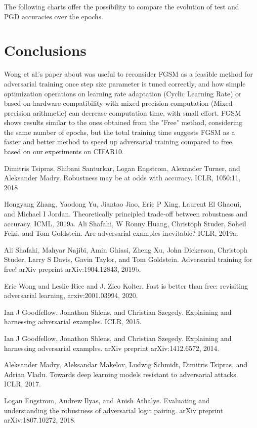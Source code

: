 \documentclass{article}
\begin{document}
The following charts offer the possibility to compare the evolution of test and PGD accuracies over the epochs.

\section{Conclusions}
Wong et al.'s paper about was useful to reconsider FGSM as a feasible method for adversarial training once step size parameter is tuned correctly, and how simple optimization operations on learning rate adaptation (Cyclic Learning Rate) or based on hardware compatibility with mixed precision computation (Mixed-precision arithmetic) can decrease computation time, with small effort.
FGSM shows results similar to the ones obtained from the "Free" method, considering the same number of epochs, but the total training time suggests FGSM as a faster and better method to speed up adversarial training compared to free, based on our experiments on CIFAR10.   



\begin{thebibliography}{100} 
	 {Dimitris Tsipras, Shibani Santurkar, Logan Engstrom, Alexander Turner, and Aleksander Madry. Robustness may be at odds with accuracy. ICLR, 1050:11, 2018}

	 {Hongyang Zhang, Yaodong Yu, Jiantao Jiao, Eric P Xing, Laurent El Ghaoui, and Michael I Jordan. Theoretically principled trade-off between robustness and accuracy. ICML, 2019a.}
	 {Ali Shafahi, W Ronny Huang, Christoph Studer, Soheil Feizi, and Tom Goldstein. Are adversarial examples inevitable? ICLR, 2019a.}
	
	 {Ali Shafahi, Mahyar Najibi, Amin Ghiasi, Zheng Xu, John Dickerson, Christoph Studer, Larry S
		Davis, Gavin Taylor, and Tom Goldstein. Adversarial training for free!
		arXiv preprint
		arXiv:1904.12843, 2019b.}
	
	 {Eric Wong and Leslie Rice and J. Zico Kolter. Fast is better than free: revisiting adversarial learning, arxiv:2001.03994, 2020.}
	
	 {Ian J Goodfellow, Jonathon Shlens, and Christian Szegedy. Explaining and harnessing adversarial examples. ICLR, 2015.}
	
	 {Ian J Goodfellow, Jonathon Shlens, and Christian Szegedy. Explaining and harnessing adversarial examples. arXiv preprint arXiv:1412.6572, 2014.}
	
	 {Aleksander Madry, Aleksandar Makelov, Ludwig Schmidt, Dimitris Tsipras, and Adrian Vladu. Towards deep learning models resistant to adversarial attacks. ICLR, 2017.}
	
	 {Logan Engstrom, Andrew Ilyas, and Anish Athalye. Evaluating and understanding the robustness of adversarial logit pairing. arXiv preprint arXiv:1807.10272, 2018.}
	
\end{thebibliography}
	
\end{document}
